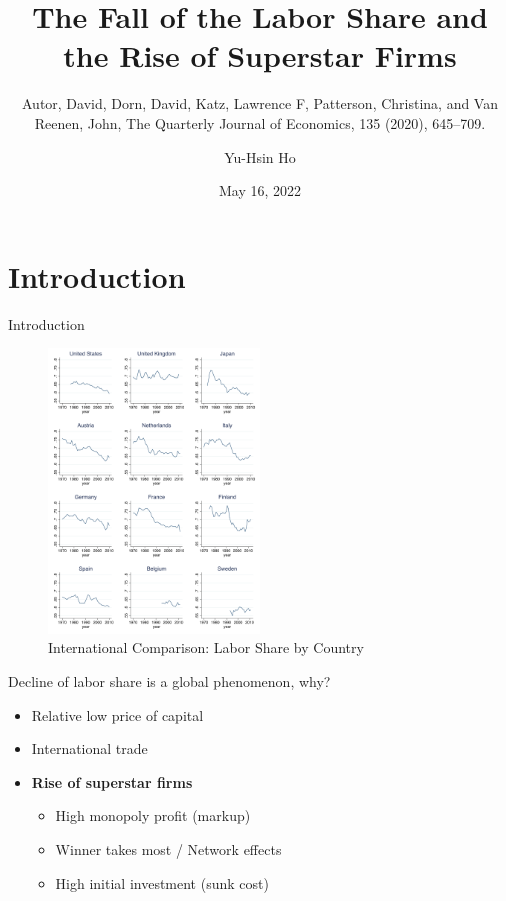 \documentclass[
  10pt,
  ignorenonframetext,
  aspectratio=43,
]{beamer}
\title{The Fall of the Labor Share and the Rise of Superstar Firms}
\subtitle{Autor, David, Dorn, David, Katz, Lawrence F, Patterson,
Christina, and Van Reenen, John, The Quarterly Journal of Economics, 135
(2020), 645--709.}
\author{Yu-Hsin Ho}
\date{May 16, 2022}
\institute{Department of Economics, National Taiwan University}
\providecommand{\tightlist}{%
  \setlength{\itemsep}{0pt}\setlength{\parskip}{0pt}}
\begin{document}
\frame{\titlepage}

\hypertarget{introduction}{%
\section{Introduction}\label{introduction}}

\begin{frame}{Introduction}
\begin{figure}
\centering
\includegraphics[width=0.5\textwidth,height=\textheight]{./images/Pasted image 20220516142524.png}
\caption{International Comparison: Labor Share by Country}
\end{figure}
\end{frame}

\begin{frame}
Decline of labor share is a global phenomenon, why?

\begin{itemize}
\tightlist
\item
  Relative low price of capital
\item
  International trade
\item
  \textbf{Rise of superstar firms}

  \begin{itemize}
  \tightlist
  \item
    High monopoly profit (markup)
  \item
    Winner takes most / Network effects
  \item
    High initial investment (sunk cost)
  \end{itemize}
\end{itemize}
\end{frame}
\end{document}
